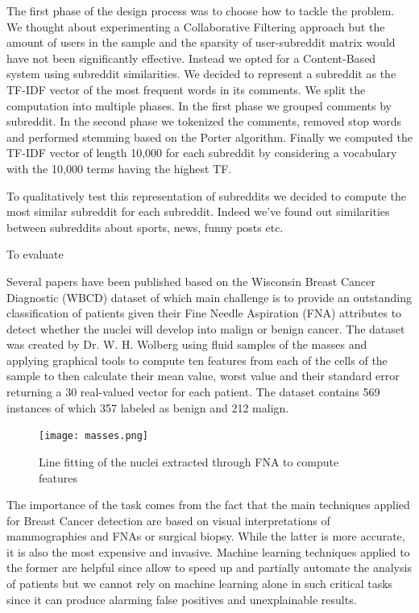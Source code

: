 \documentclass{article}
\begin{document}
The first phase of the design process was to choose how to tackle the problem.
We thought about experimenting a Collaborative Filtering approach but the amount
of users in the sample and the sparsity of user-subreddit matrix would have not
been significantly effective. Instead we opted for a Content-Based system using
subreddit similarities. We decided to represent a subreddit as the TF-IDF vector
of the most frequent words in its comments. We split the computation into
multiple phases. In the first phase we grouped comments by subreddit. In the
second phase we tokenized the comments, removed stop words and performed
stemming based on the Porter algorithm. Finally we computed the TF-IDF vector of
length 10,000 for each subreddit by considering a vocabulary with the 10,000
terms having the highest TF.

To qualitatively test this representation of subreddits we decided to compute
the most similar subreddit for each subreddit. Indeed we've found out
similarities between subreddits about sports, news, funny posts etc.

To evaluate

\iffalse
Several papers have been published based on the Wisconsin Breast Cancer
Diagnostic (WBCD) dataset of which main challenge is to provide an outstanding
classification of patients given their Fine Needle Aspiration (FNA) attributes
to detect whether the nuclei will develop into malign or benign cancer. The
dataset was created by Dr. W. H. Wolberg using fluid samples of the masses and
applying graphical tools to compute ten features from each of the cells of the
sample to then calculate their mean value, worst value and their standard error
returning a 30 real-valued vector for each patient. The dataset contains 569
instances of which 357 labeled as benign and 212 malign.

\begin{figure}[h]
\centering
\texttt{[image: masses.png]} \\
\caption{Line fitting of the nuclei extracted through FNA to compute features}
\end{figure}
The importance of the task comes from the fact that the main techniques applied
for Breast Cancer detection are based on visual interpretations of mammographies
and FNAs or surgical biopsy. While the latter is more accurate, it is also the
most expensive and invasive. Machine learning techniques applied to the former
are helpful since allow to speed up and partially automate the analysis of
patients but we cannot rely on machine learning alone in such critical tasks
since it can produce alarming false positives and unexplainable results.
\end{document}
